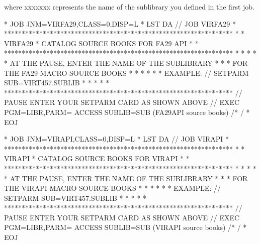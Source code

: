 \documentclass[letterpaper,10pt,english]{sphinxmanual}
\begin{document}
\begin{sphinxVerbatim}[commandchars=\\\{\}]
  
\end{sphinxVerbatim}

where  xxxxxxx represents the name of the sublibrary you defined in the first job.

\begin{sphinxVerbatim}[commandchars=\\\{\}]
* \PYGZdl{}\PYGZdl{} JOB JNM=VIRFA29,CLASS=0,DISP=L
* \PYGZdl{}\PYGZdl{} LST DA
// JOB VIRFA29
* *****************************************************************
* * VIRFA29 * CATALOG SOURCE BOOKS FOR FA29 API                   *
* *****************************************************************
* *                                                               *
* * AT THE PAUSE, ENTER THE NAME OF THE SUB\PYGZhy{}LIBRARY               *
* * FOR THE FA29 MACRO SOURCE BOOKS                               *
* *                                                               *
* * EXAMPLE: // SETPARM SUB=\PYGZsq{}VIRT457.SUBLIB\PYGZsq{}                      *
* *                                                               *
* *****************************************************************
// PAUSE ENTER YOUR SETPARM CARD AS SHOWN ABOVE
// EXEC PGM=LIBR,PARM=\PYGZsq{} ACCESS SUBLIB=\PYGZam{}SUB\PYGZsq{}
        (FA29API source books)
/*
/\PYGZam{}
* \PYGZdl{}\PYGZdl{} EOJ
\end{sphinxVerbatim}


\begin{sphinxVerbatim}[commandchars=\\\{\}]
* \PYGZdl{}\PYGZdl{} JOB JNM=VIRAPI,CLASS=0,DISP=L
* \PYGZdl{}\PYGZdl{} LST DA
// JOB VIRAPI
* *****************************************************************
* * VIRAPI * CATALOG SOURCE BOOKS FOR VIRAPI                      *
* *****************************************************************
* *                                                               *
* * AT THE PAUSE, ENTER THE NAME OF THE SUB\PYGZhy{}LIBRARY               *
* * FOR THE VIRAPI MACRO SOURCE BOOKS                             *
* *                                                               *
* * EXAMPLE: // SETPARM SUB=\PYGZsq{}VIRT457.SUBLIB\PYGZsq{}                      *
* *                                                               *
* *****************************************************************
// PAUSE ENTER YOUR SETPARM CARD AS SHOWN ABOVE
// EXEC PGM=LIBR,PARM=\PYGZsq{} ACCESS SUBLIB=\PYGZam{}SUB\PYGZsq{}
        (VIRAPI source books)
/*
/\PYGZam{}
* \PYGZdl{}\PYGZdl{} EOJ
\end{sphinxVerbatim}
\end{document}
